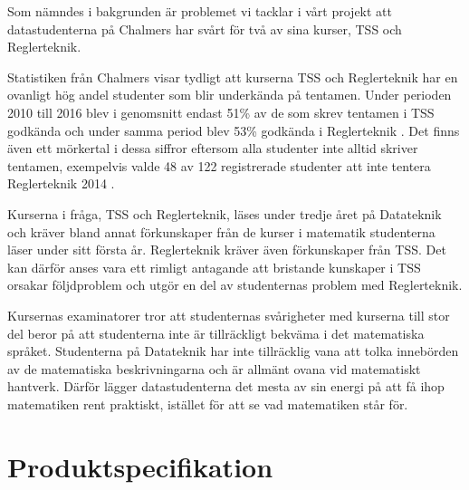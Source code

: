 \documentclass[12pt,a4paper,twoside,openright]{article}
\begin{document}

Som nämndes i bakgrunden är problemet vi tacklar i vårt projekt att
datastudenterna på Chalmers har svårt för två av sina kurser, TSS och
Reglerteknik.

Statistiken från Chalmers visar tydligt att kurserna TSS och
Reglerteknik har en ovanligt hög andel studenter som blir
underkända på tentamen. Under perioden 2010 till 2016 blev i genomsnitt
endast 51\% av de som skrev tentamen i TSS godkända och under samma
period blev 53\% godkända i Reglerteknik \cite{tentastatistik}.
Det finns även ett mörkertal i dessa siffror eftersom alla studenter
inte alltid skriver tentamen, exempelvis valde 48 av 122 registrerade
studenter att inte tentera Reglerteknik 2014
\cite{kursinformation:ere102:14-15}.

Kurserna i fråga, TSS och Reglerteknik, läses under tredje året på
Datateknik och kräver bland annat förkunskaper från de kurser i
matematik studenterna läser under sitt första år. Reglerteknik kräver
även förkunskaper från TSS. Det kan därför anses vara ett rimligt
antagande att bristande kunskaper i TSS orsakar följdproblem och utgör
en del av studenternas problem med Reglerteknik.

Kursernas examinatorer tror att studenternas svårigheter med kurserna
till stor del beror på att studenterna inte är tillräckligt bekväma i
det matematiska språket. Studenterna på Datateknik har inte
tillräcklig vana att tolka innebörden av de matematiska
beskrivningarna och är allmänt ovana vid matematiskt hantverk. Därför
lägger datastudenterna det mesta av sin energi på att få ihop
matematiken rent praktiskt, istället för att se vad matematiken står
för.

\section{Produktspecifikation}
\end{document}
